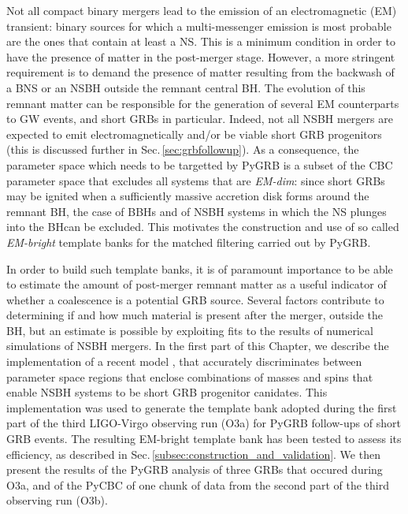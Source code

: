 \documentclass[binding=0.6cm, LaM]{sapthesis}
\begin{document}
	Not all compact binary mergers lead to the emission of an electromagnetic (EM) transient: 
	binary sources for which a multi-messenger emission is most probable are the ones that contain at least a NS.
	This is a minimum condition in order to have the presence of matter in the post-merger stage.
	However, a more stringent requirement is to demand
	the presence of matter resulting from the backwash of a BNS or an NSBH
	outside the remnant central BH.
	The evolution of this remnant matter can be responsible for the generation of several EM counterparts to GW events, and short GRBs in particular.
	Indeed, not all NSBH mergers are expected to emit electromagnetically and/or be viable short GRB progenitors (this is discussed further in Sec.\,\ref{sec:grbfollowup}).
	As a consequence, the parameter space which needs to be targetted by {\ttfamily PyGRB}
	is a subset of the CBC parameter space that excludes all systems that are \textit{EM-dim}:
	since short GRBs may be ignited when a sufficiently massive accretion disk forms around the remnant BH,
	the case of BBHs and of NSBH systems in which the NS plunges into the BHcan be excluded.
	This motivates the construction and use of 
	so called \textit{EM-bright} template banks for the matched filtering carried out by {\ttfamily PyGRB}.

	In order to build such template banks,
        it is of paramount importance to be able to estimate the amount of post-merger remnant matter as a useful indicator of 
	whether a coalescence is a potential GRB source.
	Several factors contribute to determining if and how much material is present after the merger, outside the BH,
        but an estimate is possible by exploiting fits to the results of
        numerical simulations of NSBH mergers.
	In the first part of this Chapter, we describe the implementation of a recent model \cite{54}, that accurately discriminates between parameter space 
	regions that enclose combinations of masses and spins that enable NSBH systems to be short GRB progenitor canidates.
        This implementation was used to generate the template bank adopted during the first part of the third LIGO-Virgo observing run (O3a) for {\ttfamily PyGRB} follow-ups of short GRB events.
	The resulting EM-bright template bank has been tested to assess its efficiency, as described in Sec.\,\ref{subsec:construction_and_validation}.
	We then present the results of the {\ttfamily PyGRB} analysis of three GRBs that occured during O3a, and 
	of the {\ttfamily PyCBC} of one chunk of data from the second part of the third observing run (O3b).
\end{document}
